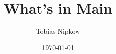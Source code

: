 \documentclass[12pt,a4paper]{article}
\begin{document}
\title{What's in Main}
\author{Tobias Nipkow}
\date{\today}
\maketitle



%
%
\end{document}
